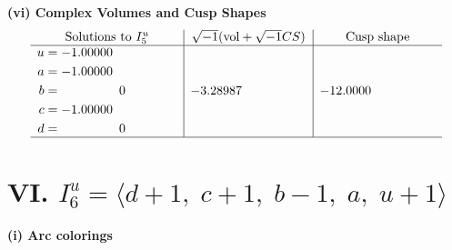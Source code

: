 \documentclass[1p]{elsarticle_modified}
\theoremstyle{definition}
\newcommand{\I}{\sqrt{-1}}
\begin{document}
\newpage\flushleft \textbf{(vi) Complex Volumes and Cusp Shapes}
$$\begin{array}{c|c|c}  
\text{Solutions to }I^u_{5}& \I (\text{vol} + \sqrt{-1}CS) & \text{Cusp shape}\\
 \hline 
\begin{aligned}
u &= -1.00000\phantom{ +0.000000I} \\
a &= -1.00000\phantom{ +0.000000I} \\
b &= \phantom{-0.000000 } 0 \\
c &= -1.00000\phantom{ +0.000000I} \\
d &= \phantom{-0.000000 } 0\end{aligned}
 & -3.28987\phantom{ +0.000000I} & -12.0000\phantom{ +0.000000I}\\
 \hline 
 \end{array}$$\newpage\newpage\renewcommand{\arraystretch}{1}
\centering \section*{VI. $I^u_{6}= \langle d+1,\;c+1,\;b-1,\;a,\;u+1 \rangle$}
\flushleft \textbf{(i) Arc colorings}\\
\end{document}
